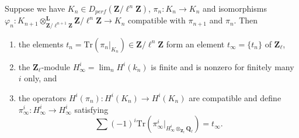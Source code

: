 \begin{lemma}
\label{lemma-piece-together}
Suppose we have
$K_n\in D_{perf}(\mathbf{Z}/\ell^n\mathbf{Z})$, $\pi_n : K_n\to K_n$
and isomorphisms
$\varphi_n :
K_{n+1} \otimes^\mathbf{L}_{\mathbf{Z}/\ell^{n+1}\mathbf{Z}}
\mathbf{Z}/\ell^n\mathbf{Z}
\to K_n$
compatible with $\pi_{n+1}$ and $\pi_n$. Then
\begin{enumerate}
\item
the elements $t_n = \text{Tr}(\pi_n |_{K_n})\in \mathbf{Z}/\ell^n\mathbf{Z}$
form an element $t_\infty = \{t_n\}$ of $\mathbf{Z}_\ell$,
\item
the $\mathbf{Z}_\ell$-module $H_\infty^i = \lim_n H^i(k_n)$ is finite and
is nonzero for finitely many $i$ only, and
\item
the operators $H^i(\pi_n): H^i(K_n)\to H^i(K_n)$ are compatible and define
$\pi_\infty^i : H_\infty^i\to H_\infty^i$ satisfying
$$
\sum (-1)^i \text{Tr}(
\pi_\infty^i |_{H_\infty^i \otimes_{\mathbf{Z}_\ell}\mathbf{Q}_\ell}) =
t_\infty.
$$
\end{enumerate}
\end{lemma}

